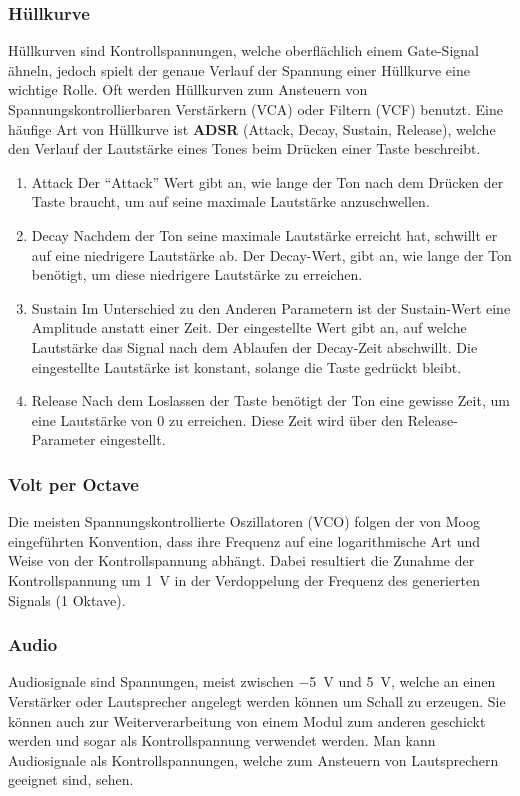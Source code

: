 \subsubsection{Hüllkurve}
\label{sec:orgedaf248}
Hüllkurven sind Kontrollspannungen, welche oberflächlich einem Gate-Signal ähneln, jedoch spielt der genaue Verlauf der Spannung einer Hüllkurve eine wichtige Rolle. Oft werden Hüllkurven zum Ansteuern von Spannungskontrollierbaren Verstärkern (VCA) oder Filtern (VCF) benutzt. Eine häufige Art von Hüllkurve ist \textbf{ADSR} (Attack, Decay, Sustain, Release), welche den Verlauf der Lautstärke eines Tones beim Drücken einer Taste beschreibt.

\begin{enumerate}
\item Attack
\label{sec:org300a996}
Der "`Attack"' Wert gibt an, wie lange der Ton nach dem Drücken der Taste braucht, um auf seine maximale Lautstärke anzuschwellen.

\item Decay
\label{sec:orgd80cdda}
Nachdem der Ton seine maximale Lautstärke erreicht hat, schwillt er auf eine niedrigere Lautstärke ab. Der Decay-Wert, gibt an, wie lange der Ton benötigt, um diese niedrigere Lautstärke zu erreichen.

\item Sustain
\label{sec:orgde87f8b}
Im Unterschied zu den Anderen Parametern ist der Sustain-Wert eine Amplitude anstatt einer Zeit. Der eingestellte Wert gibt an, auf welche Lautstärke das Signal nach dem Ablaufen der Decay-Zeit abschwillt. Die eingestellte Lautstärke ist konstant, solange die Taste gedrückt bleibt.

\item Release
\label{sec:org0ffeea9}
Nach dem Loslassen der Taste benötigt der Ton eine gewisse Zeit, um eine Lautstärke von 0 zu erreichen. Diese Zeit wird über den Release-Parameter eingestellt.
\end{enumerate}


\subsubsection{Volt per Octave}
\label{sec:orgd38d3f8}
Die meisten Spannungskontrollierte Oszillatoren (VCO) folgen der von Moog eingeführten Konvention, dass ihre Frequenz auf eine logarithmische Art und Weise von der Kontrollspannung abhängt. Dabei resultiert die Zunahme der Kontrollspannung um \SI{1}{\volt} in der Verdoppelung der Frequenz des generierten Signals (1 Oktave).

\subsubsection{Audio}
\label{sec:org74698a7}
Audiosignale sind Spannungen, meist zwischen \SI{-5}{\volt} und \SI{5}{\volt}, welche an einen Verstärker oder Lautsprecher angelegt werden können um Schall zu erzeugen. Sie können auch zur Weiterverarbeitung von einem Modul zum anderen geschickt werden und sogar als Kontrollspannung verwendet werden. Man kann Audiosignale als Kontrollspannungen, welche zum Ansteuern von Lautsprechern geeignet sind, sehen.

